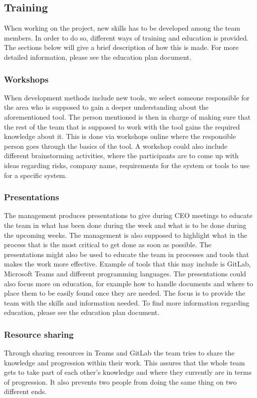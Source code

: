 \subsection{Training}
When working on the project, new skills has to be developed among the team members. In order to do so, different ways of training and education is provided. The sections below will give a brief description of how this is made. For more detailed information, please see the education plan document. 
\subsubsection{Workshops}
When development methods include new tools, we select someone responsible for the area who is supposed to gain a deeper understanding about the aforementioned tool. The person mentioned is then in charge of making sure that the rest of the team that is supposed to work with the tool gains the required knowledge about it. This is done via workshops online where the responsible person goes through the basics of the tool.  A workshop could also include different brainstorming activities, where the participants are to come up with ideas regarding risks, company name, requirements for the system or tools to use for a specific system. 

\subsubsection{Presentations}
The management produces presentations to give during CEO meetings to educate the team in what has been done during the week and what is to be done during the upcoming weeks. The management is also supposed to highlight what in the process that is the most critical to get done as soon as possible. The presentations might also be used to educate the team in processes and tools that makes the work more effective. Example of tools that this may include is GitLab, Microsoft Teams and different programming languages. The presentations could also focus more on education, for example how to handle documents and where to place them to be easily found once they are needed. The focus is to provide the team with the skills and information needed. To find more information regarding education, please see the education plan document. 

\subsubsection{Resource sharing}
Through sharing resources in Teams and GitLab the team tries to share the knowledge and progression within their work. This assures that the whole team gets to take part of each other’s knowledge and where they currently are in terms of progression. It also prevents two people from doing the same thing on two different ends. 

